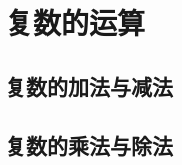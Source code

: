 \section{复数的运算}
\subsection{复数的加法与减法}
\begin{Practice}
  \begin{question}
    \item 
    \item 
    \item 
    \item 
    \item 
  \end{question}
\end{Practice}

\subsection{复数的乘法与除法}
\begin{Practice}
  \begin{question}
    \item 
    \item 
    \item 
    \item 
  \end{question}
\end{Practice}

\begin{Exercise}
  \begin{question}
    \item 
    \item 
    \item 
    \item 
    \item 
    \item 
    \item 
    \item 
    \item 
    \item 
    \item 
    \item 
    \item 
    \item 
    \item 
    \item 
    \item 
    \item 
    \item 
    \item 
  \end{question}
\end{Exercise}

